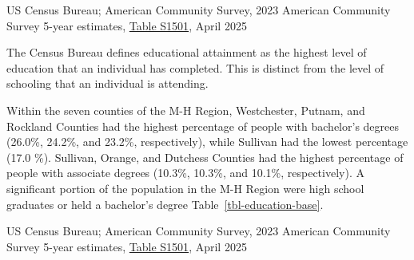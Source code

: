 \documentclass[
  english,
  letterpaper,
]{report}
\begin{document}
\begin{tcolorbox}[enhanced jigsaw, breakable, leftrule=.75mm, title=\textcolor{quarto-callout-note-color}{\faInfo}\hspace{0.5em}{Source}, bottomrule=.15mm, opacityback=0, left=2mm, colback=white, bottomtitle=1mm, coltitle=black, colbacktitle=quarto-callout-note-color!10!white, colframe=quarto-callout-note-color-frame, opacitybacktitle=0.6, toptitle=1mm, titlerule=0mm, arc=.35mm, rightrule=.15mm, toprule=.15mm]

US Census Bureau; American Community Survey, 2023 American Community
Survey 5-year estimates,
\href{https://data.census.gov/table/ACSST5Y2020.S1501?q=s1501&g=050XX00US36105,36027,36071,36119,36087,36079,36111_160XX00US3651000_040XX00US36&tid=ACSST5Y2020.S1501}{Table
S1501}, April 2025

\end{tcolorbox}

\begin{tcolorbox}[enhanced jigsaw, breakable, leftrule=.75mm, title=\textcolor{quarto-callout-note-color}{\faInfo}\hspace{0.5em}{Note}, bottomrule=.15mm, opacityback=0, left=2mm, colback=white, bottomtitle=1mm, coltitle=black, colbacktitle=quarto-callout-note-color!10!white, colframe=quarto-callout-note-color-frame, opacitybacktitle=0.6, toptitle=1mm, titlerule=0mm, arc=.35mm, rightrule=.15mm, toprule=.15mm]

The Census Bureau defines educational attainment as the highest level of
education that an individual has completed. This is distinct from the
level of schooling that an individual is attending.

\end{tcolorbox}

Within the seven counties of the M-H Region, Westchester, Putnam, and
Rockland Counties had the highest percentage of people with bachelor's
degrees (26.0\%, 24.2\%, and 23.2\%, respectively), while Sullivan had
the lowest percentage (17.0 \%). Sullivan, Orange, and Dutchess Counties
had the highest percentage of people with associate degrees (10.3\%,
10.3\%, and 10.1\%, respectively). A significant portion of the
population in the M-H Region were high school graduates or held a
bachelor's degree Table~\ref{tbl-education-base}.

\begin{tcolorbox}[enhanced jigsaw, breakable, leftrule=.75mm, title=\textcolor{quarto-callout-note-color}{\faInfo}\hspace{0.5em}{Source}, bottomrule=.15mm, opacityback=0, left=2mm, colback=white, bottomtitle=1mm, coltitle=black, colbacktitle=quarto-callout-note-color!10!white, colframe=quarto-callout-note-color-frame, opacitybacktitle=0.6, toptitle=1mm, titlerule=0mm, arc=.35mm, rightrule=.15mm, toprule=.15mm]

US Census Bureau; American Community Survey, 2023 American Community
Survey 5-year estimates,
\href{https://data.census.gov/table/ACSST5Y2020.S1501?q=s1501&g=050XX00US36105,36027,36071,36119,36087,36079,36111_160XX00US3651000_040XX00US36&tid=ACSST5Y2020.S1501}{Table
S1501}, April 2025

\end{tcolorbox}
\end{document}
